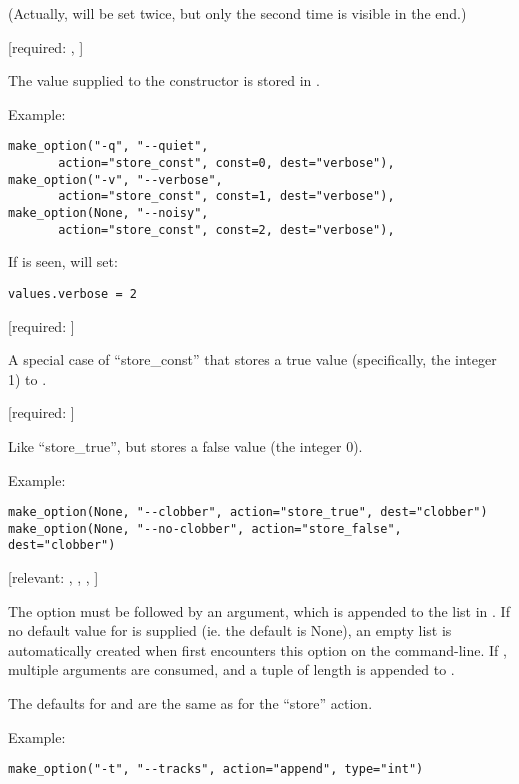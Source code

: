 \begin{definitions}
(Actually,  will be set twice, but only the second
time is visible in the end.)

 [required: , ]

The  value supplied to the  constructor is
stored in .

Example:

\begin{verbatim}
make_option("-q", "--quiet",
       action="store_const", const=0, dest="verbose"),
make_option("-v", "--verbose",
       action="store_const", const=1, dest="verbose"),
make_option(None, "--noisy",
       action="store_const", const=2, dest="verbose"),
\end{verbatim}

If  is seen,  will set:

\begin{verbatim}
values.verbose = 2
\end{verbatim}

 [required: ]

A special case of ``store_const'' that stores a true value
(specifically, the integer 1) to .

 [required: ]

Like ``store_true'', but stores a false value (the integer 0).

Example:

\begin{verbatim}
make_option(None, "--clobber", action="store_true", dest="clobber")
make_option(None, "--no-clobber", action="store_false", dest="clobber")
\end{verbatim}

 [relevant: , , , ]

The option must be followed by an argument, which is appended to the
list in . If no default value for  is supplied
(ie. the default is None), an empty list is automatically created when
 first encounters this option on the command-line.
If , multiple arguments are consumed, and a tuple of
length  is appended to .

The defaults for  and  are the same as for the
``store'' action.

Example:

\begin{verbatim}
make_option("-t", "--tracks", action="append", type="int")
\end{verbatim}


\end{definitions}
